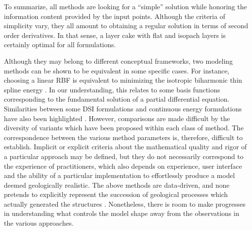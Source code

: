 \documentclass[preprint]{ring20}
\begin{document}
To summarize, all methods are looking for a ``simple'' solution while honoring the information content provided by the input points. Although the criteria of simplicity vary, they all amount to obtaining a regular solution in terms of second order derivatives. In that sense, a layer cake with flat and isopach layers is certainly optimal for all formulations. 

Although they may belong to different conceptual frameworks, two modeling methods can be shown to be equivalent in some specific cases. For instance, choosing a linear RBF is equivalent to minimizing the isotropic biharmonic thin spline energy \citep{Carr2001}. In our understanding, this relates to some basis functions corresponding to the fundamental solution of a partial differential equation. Similarities between some DSI formulations and continuous energy formulations have also been highlighted \citep{Renaudeau2019MG,Irakarama2022CD}. However, comparisons are made difficult by the diversity of variants which have been proposed within each class of method. The correspondence between the various method parameters is, therefore, difficult to establish. Implicit or explicit criteria about the mathematical quality and rigor of a particular approach may be defined, but they do not necessarily correspond to the experience of practitioners, which also depends on experience, user interface and the ability of a particular implementation to effortlessly produce a model deemed geologically realistic. The above methods are data-driven, and none pretends to explicitly represent the succession of geological processes which actually generated the structures \citep{Caumon2010MG,Jessell2010T}. Nonetheless, there is room to make progresses in understanding what controls the model shape away from the observations in the various approaches. %

\end{document}
